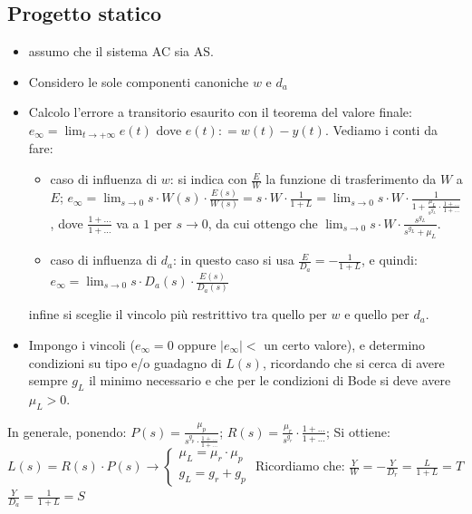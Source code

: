 \begin{landscape}
\begin{multicols*}{2}
    \subsection{Progetto statico}
    \begin{itemize}
        \item assumo che il sistema AC sia AS.
        \item Considero le sole componenti canoniche $w$ e $d_a$
        \item Calcolo l'errore a transitorio esaurito con il teorema del valore finale:\newline
        $e_\infty = \lim_{t\rightarrow +\infty} e(t)$ dove $e(t) : = w(t) - y(t)$.\newline
        Vediamo i conti da fare:
        \begin{itemize}
            \item caso di influenza di $w$: si indica con $\frac{E}{W}$ la funzione di trasferimento da $W$ a $E$; $e_\infty = \lim_{s\rightarrow 0} s \cdot W(s) \cdot \frac{E(s)}{W(s)} = s \cdot W \cdot  \frac{1}{1+L} = \lim_{s\rightarrow 0} s \cdot W \cdot \frac{1}{1+ \frac{\mu_L}{s^{g_L}} \cdot \frac{1 + \dots}{1 + \dots}}$, dove $\frac{1 + \dots}{1 + \dots}$ va a $1$ per $s \rightarrow 0$, da cui ottengo che $\lim_{s\rightarrow 0} s \cdot W \cdot \frac{s^{g_L}}{s^{g_L} + \mu_L}$.
            \item caso di influenza di $d_a$: in questo caso si usa $\frac{E}{D_a} = - \frac{1}{1+L}$, e quindi: $e_\infty = \lim_{s\rightarrow 0} s \cdot D_a(s) \cdot \frac{E(s)}{D_a(s)}$
        \end{itemize}
        infine si sceglie il vincolo più restrittivo tra quello per $w$ e quello per $d_a$.
        \item Impongo i vincoli ($e_\infty = 0$ oppure $|e_\infty| < $ un certo valore), e determino condizioni su tipo e/o guadagno di $L(s)$, ricordando che si cerca di avere sempre $g_L$ il minimo necessario e che per le condizioni di Bode si deve avere $\mu_L > 0$.
    \end{itemize}
    In generale, ponendo: \newline
    $P(s) = \frac{\mu_p}{s^{g_p} \cdot  \frac{1+ \dots}{1+ \dots}}$;\newline
    $R(s) = \frac{\mu_r}{s^{g_r}} \cdot  \frac{1+ \dots}{1+ \dots}$;\newline
    Si ottiene: \newline
    $L(s) = R(s) \cdot P(s) \rightarrow \begin{cases}
        \mu_L = \mu_r \cdot \mu_p\\
        g_L = g_r + g_p
    \end{cases}$\newline
    Ricordiamo che:\newline
    $\frac{Y}{W} = - \frac{Y}{D_r} = \frac{L}{1+L} = T$\newline
    $\frac{Y}{D_a} = \frac{1}{1+L} = S$

\end{multicols*}
\end{landscape}
